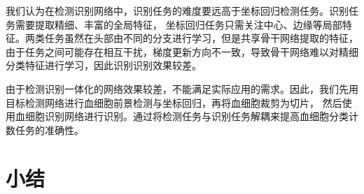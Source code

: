 我们认为在检测识别网络中，识别任务的难度要远高于坐标回归检测任务。识别任务需要提取精细、丰富的全局特征，
坐标回归任务只需关注中心、边缘等局部特征。两类任务虽然在头部由不同的分支进行学习，但是共享骨干网络提取的特征，
由于任务之间可能存在相互干扰，梯度更新方向不一致，导致骨干网络难以对精细分类特征进行学习，因此识别识别效果较差。

 由于检测识别一体化的网络效果较差，不能满足实际应用的需求。因此，我们先用目标检测网络进行血细胞前景检测与坐标回归，再将血细胞裁剪为切片，
 然后使用血细胞识别网络进行识别。通过将检测任务与识别任务解耦来提高血细胞分类计数任务的准确性。
 

\section{小结}


